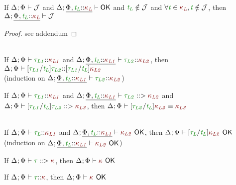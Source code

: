 \documentclass[11pt]{article}
\begin{document}
    \begin{lemma}[Weakening]
        \vphantom{.}\\
        If $\J$ and $\ContextWellFormed[\HoleCtx\xExtendTypVarCtx[][L][\knd[L]]]$ and $\typvar[L]\notin\mathcal{J}$ and $\forall\typvar\in\knd[L],\typvar\notin\mathcal{J}$, then $\J[\HoleCtx\xExtendTypVarCtx[][L][\knd[L]]]$
    \end{lemma}
    \begin{proof}
        see addendum
    \end{proof}
    \noindent\hrulefill
    \begin{lemma}[K-Substitution]
        \vphantom{.}\\
        If $\WellFormedAtKind{\typ[L1]}[\knd[L1]]$ and $\WellFormedAtKind[\HoleCtx\xExtendTypVarCtx[][L][{\knd[L1]}]]{\typ[L2]}[\knd[L2]]$, then $\WellFormedAtKind{\subst{\typ[L1]}{\typvar[L]}{\typ[L2]}}[\subst{\typ[L1]}{\typvar[L]}{\knd[L2]}]$ \\
        (induction on $\WellFormedAtKind[\HoleCtx\xExtendTypVarCtx[][L][{\knd[L1]}]]{\typ[L2]}[\knd[L2]]$)
    \end{lemma}
    \begin{lemma}[PK-Substitution]
        If $\WellFormedAtKind{\typ[L1]}[\knd[L1]]$ and $\PrincipalKind[\HoleCtx\xExtendTypVarCtx[][L][\knd[L1]]]{\typ[L2]}[\knd[L2]]$ and $\PrincipalKind{\subst{\typ[L1]}{\typvar[L]}{\typ[L2]}}[\knd[L3]]$, then $\KindEquiv{\subst{\typ[L2]}{\typvar[L]}{\knd[L2]}}{\knd[L3]}$
    \end{lemma}
    \begin{lemma}[OK-Substitution]
        \vphantom{.}\\
        If $\WellFormedAtKind{\typ[L]}[\knd[L1]]$ and $\KindWellFormed[{\knd[L2]}][\HoleCtx\xExtendTypVarCtx[][L][{\knd[L1]}]]$, then $\KindWellFormed[\subst{\typ[L]}{\typvar[L]}{\knd[L2]}]$ \\
        (induction on $\KindWellFormed[{\knd[L2]}][\HoleCtx\xExtendTypVarCtx[][L][{\knd[L1]}]]$)
    \end{lemma}
    \begin{theorem}[OK-PK]
        If $\PrincipalKind{\typ}$, then $\KindWellFormed$
    \end{theorem}
    \begin{theorem}[OK-WFaK]
        If $\WellFormedAtKind{\typ}$, then $\KindWellFormed$
    \end{theorem}
\end{document}

